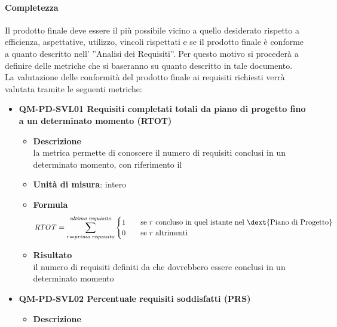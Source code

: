 			\paragraph{Completezza}
				Il prodotto finale deve essere il più possibile vicino a quello desiderato rispetto a efficienza, aspettative, utilizzo, vincoli rispettati e se il prodotto finale è conforme a quanto descritto nell’ ”Analisi dei Requisiti”. Per questo motivo si procederà a definire delle metriche che si baseranno su quanto descritto in tale documento.\\
				La valutazione delle conformità del prodotto finale ai requisiti richiesti verrà valutata tramite le seguenti metriche:\\
				\begin{itemize}
					\item\textbf{QM-PD-SVL01 Requisiti completati totali da piano di progetto fino a un determinato momento (RTOT)}
						\begin{itemize}
							\item\textbf{Descrizione}\\
								la metrica permette di conoscere il numero di requisiti conclusi in un determinato momento, con riferimento il \\
							\item\textbf{Unità di misura}: intero
							\item\textbf{Formula}\\
								$$ \mathit{RTOT} = \sum_{r = \mathit{primo\;requisito}}^{\mathit{ultimo\;requisito}}
  									\begin{cases}
    										1       & \quad \text{se } r \text{ concluso in quel istante nel \dext{Piano di Progetto}}\\
    										0  & \quad \text{se } r \text{ altrimenti}
 								 	\end{cases}
								$$
							\item\textbf{Risultato}\\
								il numero di requisiti definiti da  che dovrebbero essere conclusi in un determinato momento
								\newline
								\newline
								\newline
						\end{itemize}
					\item\textbf{QM-PD-SVL02 Percentuale requisiti soddisfatti (PRS)}
						\begin{itemize}
							\item\textbf{Descrizione}\\

\end{itemize}
\end{itemize}
